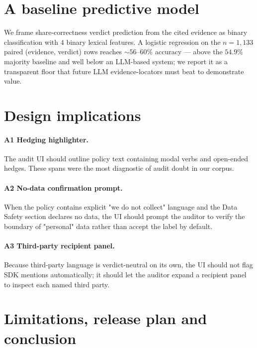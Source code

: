 \documentclass[11pt,a4paper]{article}
\begin{document}
\section{A baseline predictive model}
We frame share-correctness verdict prediction from the cited evidence
as binary classification with $4$ binary lexical features. A logistic
regression on the $n=1{,}133$ paired (evidence, verdict) rows reaches
$\sim 56$--$60\%$ accuracy --- above the $54.9\%$ majority baseline and
well below an LLM-based system; we report it as a transparent
floor that future LLM evidence-locators must beat to demonstrate value.

\section{Design implications}
\paragraph{A1 Hedging highlighter.} The audit UI should outline policy
text containing modal verbs and open-ended hedges. These spans were the
most diagnostic of audit doubt in our corpus.
\paragraph{A2 No-data confirmation prompt.} When the policy contains
explicit "we do not collect" language and the Data Safety section
declares no data, the UI should prompt the auditor to verify the
boundary of "personal" data rather than accept the label by default.
\paragraph{A3 Third-party recipient panel.} Because third-party
language is verdict-neutral on its own, the UI should not flag SDK
mentions automatically; it should let the auditor expand a recipient
panel to inspect each named third party.

\section{Limitations, release plan and conclusion}
\end{document}
